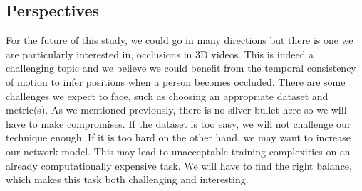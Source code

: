 \documentclass[runningheads]{llncs}
\begin{document}
\subsection{Perspectives}
For the future of this study, we could go in many directions but there is one we are particularly interested in, occlusions in 3D videos. This is indeed a challenging topic and we believe we could benefit from the temporal consistency of motion to infer positions when a person becomes occluded. There are some challenges we expect to face, such as choosing an appropriate dataset and metric(s). As we mentioned previously, there is no silver bullet here so we will have to make compromises. If the dataset is too easy, we will not challenge our technique enough. If it is too hard on the other hand, we may want to increase our network model. This may lead to unacceptable training complexities on an already computationally expensive task. We will have to find the right balance, which makes this task both challenging and interesting.
\end{document}
